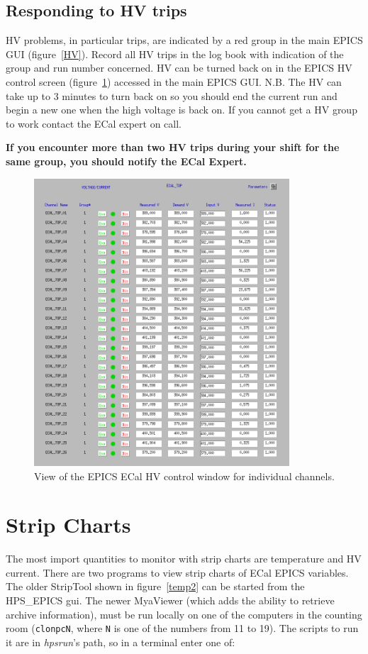 \documentclass[12pt]{article}
\begin{document}
   \subsection{Responding to HV trips}

      HV problems, in particular trips, are indicated by a red group in the main EPICS GUI (figure~\ref{HV}). Record all HV trips in the log book with indication of the group and run number concerned. HV can be turned back on in the EPICS HV control screen (figure~\ref{HVControl}) accessed in the main EPICS GUI. N.B. The HV can take up to 3 minutes to turn back on so you should end the current run and begin a new one when the high voltage is back on. If you cannot get a HV group to work contact the ECal expert on call.

      {\bf If you encounter more than two HV trips during your shift for the same group, you should notify the ECal Expert.}

\begin{figure}[htbp]
\center
\includegraphics[width=0.85\textwidth]{pics/ecalhv_setting_2014_12_15.png}
\caption{\small \label{HVControl} View of the EPICS ECal HV control window for individual channels.}
\end{figure}

  \section{Strip Charts}
      The most import quantities to monitor with strip charts are temperature and HV current.  There are two programs to view strip charts of ECal EPICS variables.  The older StripTool shown in figure~\ref{temp2} can be started from the HPS\_EPICS gui.  The newer MyaViewer (which adds the ability to retrieve archive information), must be run locally on one of the computers in the counting room (\texttt{clonpcN}, where \texttt{N} is one of the numbers from 11 to 19).  The scripts to run it are in {\it hpsrun}'s path, so in a terminal enter one of:
      
\end{document}
